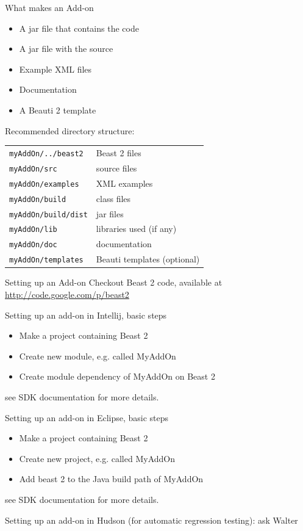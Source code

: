 \documentclass{beamer}
\theoremstyle{definition}
\begin{document}
\begin{frame}{What makes an Add-on}

\begin{itemize}
\item A jar file that contains the code
\item A jar file with the source
\item Example XML files
\item Documentation
\item A Beauti 2 template
\end{itemize}\vskip0.5cm

Recommended directory structure:\\
\begin{tabular}{ll}
{\color{blue}\tt myAddOn/../beast2} &Beast 2 files\\
{\color{blue}\tt myAddOn/src} &source files\\
{\color{blue}\tt myAddOn/examples} &XML examples\\
{\color{blue}\tt myAddOn/build} &class files\\
{\color{blue}\tt myAddOn/build/dist} &jar files\\
{\color{black}\tt myAddOn/lib} &libraries used (if any)\\
{\color{black}\tt myAddOn/doc} &documentation\\
{\color{black}\tt myAddOn/templates} &Beauti templates (optional)
\end{tabular}

\end{frame}

\begin{frame}{Setting up an Add-on}
Checkout Beast 2 code, available at
\url{http://code.google.com/p/beast2}\vskip0.5cm

Setting up an add-on in Intellij, basic steps
\begin{itemize}
\item Make a project containing Beast 2
\item Create new module, e.g. called MyAddOn
\item Create module dependency of MyAddOn on Beast 2
\end{itemize}
see SDK documentation for more details.\vskip0.5cm

Setting up an add-on in Eclipse, basic steps
\begin{itemize}
\item Make a project containing Beast 2
\item Create new project, e.g. called MyAddOn
\item Add beast 2 to the Java build path of MyAddOn
\end{itemize}
see SDK documentation for more details.\vskip0.5cm

Setting up an add-on in Hudson (for automatic regression testing): ask Walter
\end{frame}
\end{document}

